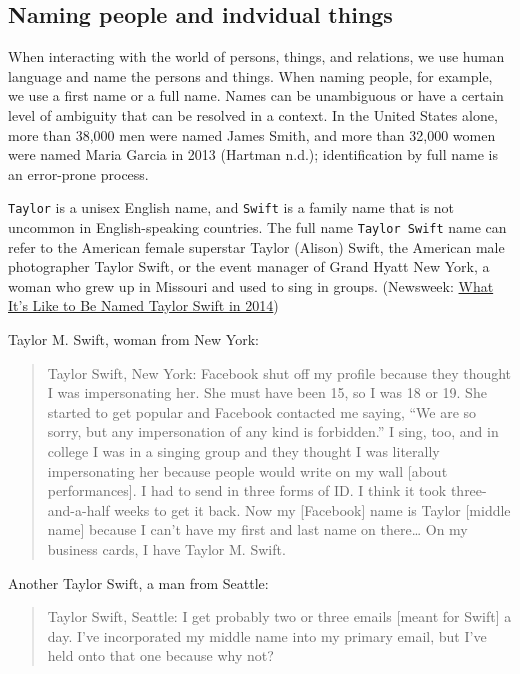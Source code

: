 \documentclass[
  letterpaper,
  DIV=11,
  numbers=noendperiod]{scrreprt}
\begin{document}
\subsection{Naming people and indvidual
things}\label{sec-naming-individual-entities}

When interacting with the world of persons, things, and relations, we
use human language and name the persons and things. When naming people,
for example, we use a first name or a full name. Names can be
unambiguous or have a certain level of ambiguity that can be resolved in
a context. In the United States alone, more than 38,000 men were named
James Smith, and more than 32,000 women were named Maria Garcia in 2013
(Hartman n.d.); identification by full name is an error-prone process.

\texttt{Taylor} is a unisex English name, and \texttt{Swift} is a family
name that is not uncommon in English-speaking countries. The full name
\texttt{Taylor\ Swift} name can refer to the American female superstar
Taylor (Alison) Swift, the American male photographer Taylor Swift, or
the event manager of Grand Hyatt New York, a woman who grew up in
Missouri and used to sing in groups. (Newsweek:
\href{https://www.newsweek.com/two-people-named-taylor-swift-talk-about-being-named-taylor-swift-age-taylor-283861}{What
It's Like to Be Named Taylor Swift in 2014})

Taylor M. Swift, woman from New York:

\begin{quote}
Taylor Swift, New York: Facebook shut off my profile because they
thought I was impersonating her. She must have been 15, so I was 18 or
19. She started to get popular and Facebook contacted me saying, ``We
are so sorry, but any impersonation of any kind is forbidden.'' I sing,
too, and in college I was in a singing group and they thought I was
literally impersonating her because people would write on my wall
{[}about performances{]}. I had to send in three forms of ID. I think it
took three-and-a-half weeks to get it back. Now my {[}Facebook{]} name
is Taylor {[}middle name{]} because I can't have my first and last name
on there\ldots{} On my business cards, I have Taylor M. Swift.
\end{quote}

Another Taylor Swift, a man from Seattle:

\begin{quote}
Taylor Swift, Seattle: I get probably two or three emails {[}meant for
Swift{]} a day. I've incorporated my middle name into my primary email,
but I've held onto that one because why not?
\end{quote}
\end{document}
